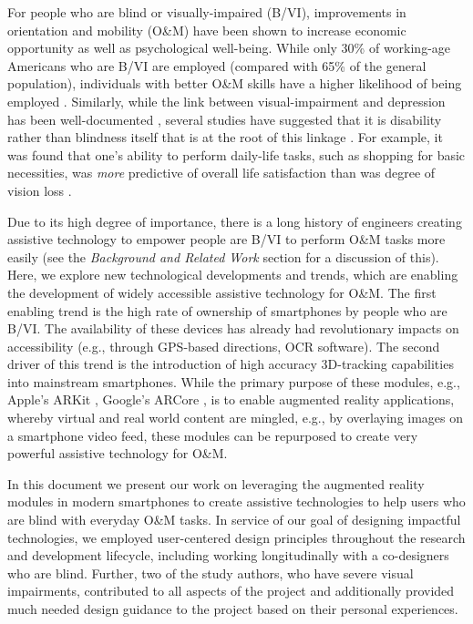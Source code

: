 \documentclass[chi_draft]{sigchi}
\newcommand{\BVI}{B/VI\xspace}
\newcommand{\OM}{O\&M\xspace}
\begin{document}
For people who are blind or visually-impaired (\BVI), improvements in orientation and mobility (\OM) have been shown to increase economic opportunity as well as psychological well-being.  While only 30\% of working-age Americans who are \BVI are employed \cite{employmentstatistics2017, kirchner1999looking} (compared with 65\% of the general population), individuals with better \OM skills have a higher likelihood of being employed \cite{crudden1998comprehensive, crudden1999barriers, leonard1999factors, o1999employment}.   Similarly, while the link between visual-impairment and depression has been well-documented \cite{rubin1994visual, rovner1996depression, hayman2007depression, heyl2001psychosocial}, several studies have suggested that it is disability rather than blindness itself that is at the root of this linkage \cite{rovner1996depression, williams1998psychosocial}.  For example, it was found that one's ability to perform daily-life tasks, such as shopping for basic necessities, was \emph{more} predictive of overall life satisfaction than was degree of vision loss \cite{williams1998psychosocial}.

Due to its high degree of importance, there is a long history of engineers creating assistive technology to empower people are \BVI to perform \OM tasks more easily (see the \emph{Background and Related Work} section for a discussion of this).  Here, we explore new technological developments and trends, which are enabling the development of widely accessible assistive technology for \OM.  The first enabling trend is the high rate of ownership of smartphones by people who are \BVI \cite{morris2014blind}.  The availability of these devices has already had revolutionary impacts on accessibility (e.g., through GPS-based directions, OCR software).  The second driver of this trend is the introduction of high accuracy 3D-tracking capabilities into mainstream smartphones.  While the primary purpose of these modules, e.g., Apple's ARKit \cite{arkit}, Google's ARCore \cite{arcore}, is to enable augmented reality applications, whereby virtual and real world content are mingled, e.g., by overlaying images on a smartphone video feed, these modules can be repurposed to create very powerful assistive technology for \OM.

In this document we present our work on leveraging the augmented reality modules in modern smartphones to create assistive technologies to help users who are blind with everyday \OM tasks.  In service of our goal of designing impactful technologies, we employed user-centered design principles throughout the research and development lifecycle, including working longitudinally with a co-designers who are blind.  Further, two of the study authors, who have severe visual impairments, contributed to all aspects of the project and additionally provided much needed design guidance to the project based on their personal experiences.
\end{document}
